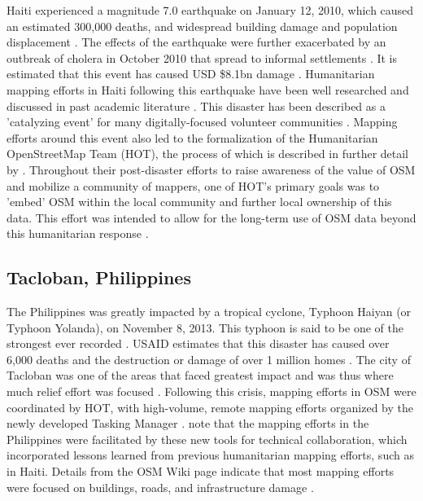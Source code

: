 Haiti experienced a magnitude 7.0 earthquake on January 12, 2010, which caused an estimated 300,000 deaths, and widespread building damage and population displacement \parencite{desroches_overview_2011}. The effects of the earthquake were further exacerbated by an outbreak of cholera in October 2010 that spread to informal settlements \parencite{noauthor_world_2011}. It is estimated that this event has caused USD \$8.1bn damage \parencite{cavallo_estimating_2010}. Humanitarian mapping efforts in Haiti following this earthquake have been well researched and discussed in past academic literature \parencite{zook_volunteered_2010, soden_crowdsourced_2014, palen_success_2015, meier_crisis_2012}. This disaster has been described as a 'catalyzing event' for many digitally-focused volunteer communities \parencite[p. 314]{soden_crowdsourced_2014}. Mapping efforts around this event also led to the formalization of the Humanitarian OpenStreetMap Team (HOT), the process of which is described in further detail by \textcite{soden_crowdsourced_2014}. Throughout their post-disaster efforts to raise awareness of the value of OSM and mobilize a community of mappers, one of HOT's primary goals was to 'embed' OSM within the local community and further local ownership of this data. This effort was intended to allow for the long-term use of OSM data beyond this humanitarian response \parencite{soden_crowdsourced_2014}.

\subsection{Tacloban, Philippines}

The Philippines was greatly impacted by a tropical cyclone, Typhoon Haiyan (or Typhoon Yolanda), on November 8, 2013. This typhoon is said to be one of the strongest ever recorded \parencite{lum_typhoon_2014}. USAID estimates that this disaster has caused over 6,000 deaths and the destruction or damage of over 1 million homes \parencite{noauthor_typhoon_2014}. The city of Tacloban was one of the areas that faced greatest impact and was thus where much relief effort was focused \parencite{lum_typhoon_2014}. Following this crisis, mapping efforts in OSM were coordinated by HOT, with high-volume, remote mapping efforts organized by the newly developed Tasking Manager \parencite{noauthor_wikipage_2018}. \textcite{palen_success_2015} note that the mapping efforts in the Philippines were facilitated by these new tools for technical collaboration, which incorporated lessons learned from previous humanitarian mapping efforts, such as in Haiti. Details from the OSM Wiki page indicate that most mapping efforts were focused on buildings, roads, and infrastructure damage \parencite{noauthor_wikiproject_2018}. 

